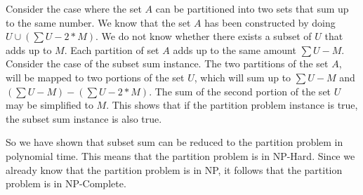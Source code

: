 \documentclass[paper=a4, fontsize=11pt]{scrartcl} %
\numberwithin{equation}{section} %
\numberwithin{figure}{section} %
\numberwithin{table}{section} %
\begin{document}
\begin{enumerate}
Consider the case where the set $A$ can be partitioned into two sets that sum up to the same number. We know that the set $A$ has been constructed by doing $U \cup (\sum U - 2* M)$. We do not know whether there exists a subset of $U$ that adds up to $M$. Each partition of set $A$ adds up to the same amount $\sum U - M$. Consider the case of the subset sum instance. The two partitions of the set $A$, will be mapped to two portions of the set $U$, which will sum up to $\sum U - M$ and $(\sum U - M) - (\sum U - 2* M)$. The sum of the second portion of the set $U$ may be simplified to $M$. This shows that if the partition problem instance is true, the subset sum instance is also true.

So we have shown that subset sum can be reduced to the partition problem in polynomial time. This means that the partition problem is in NP-Hard. Since we already know that the partition problem is in NP, it follows that the partition problem is in NP-Complete.

\end{enumerate}

\end{document}
